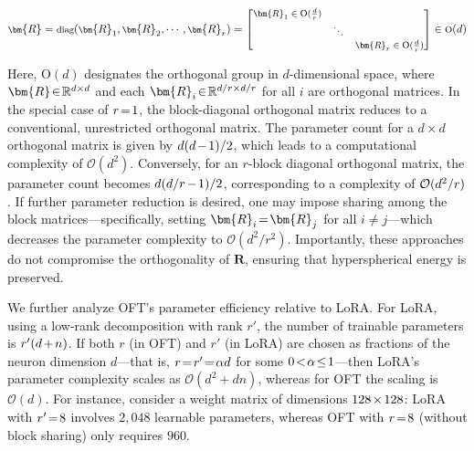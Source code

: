 \begin{equation}
    \footnotesize
    \bm{R}=\text{diag}(\bm{R}_1,\bm{R}_2,\cdots,\bm{R}_r)=\begin{bmatrix}
    \bm{R}_1\in \text{O}(\frac{d}{r}) &  &\\
    &\ddots & \\
    & & \bm{R}_r\in \text{O}(\frac{d}{r})
    \end{bmatrix}\in \text{O}(d)
\end{equation}

Here, $\text{O}(d)$ designates the orthogonal group in $d$-dimensional space, where $\thickmuskip=2mu \medmuskip=2mu \bm{R}\in\mathbb{R}^{d\times d}$ and each $\thickmuskip=2mu \medmuskip=2mu \bm{R}_i\in\mathbb{R}^{d/r\times d/r}$ for all $i$ are orthogonal matrices. In the special case of $\thickmuskip=2mu \medmuskip=2mu r=1$, the block-diagonal orthogonal matrix reduces to a conventional, unrestricted orthogonal matrix. The parameter count for a $d\times d$ orthogonal matrix is given by $\thickmuskip=2mu \medmuskip=2mu d(d-1)/2$, which leads to a computational complexity of $\mathcal{O}(d^2)$. Conversely, for an $r$-block diagonal orthogonal matrix, the parameter count becomes $\thickmuskip=2mu \medmuskip=2mu d(d/r-1)/2$, corresponding to a complexity of $\thickmuskip=2mu \medmuskip=2mu \mathcal{O}(d^2/r)$. If further parameter reduction is desired, one may impose sharing among the block matrices—specifically, setting $\thickmuskip=2mu \medmuskip=2mu\bm{R}_i=\bm{R}_j$ for all $i\neq j$—which decreases the parameter complexity to $\mathcal{O}(d^2/r^2)$. Importantly, these approaches do not compromise the orthogonality of $\bm{R}$, ensuring that hyperspherical energy is preserved.

We further analyze OFT's parameter efficiency relative to LoRA. For LoRA, using a low-rank decomposition with rank $r'$, the number of trainable parameters is $\thickmuskip=2mu \medmuskip=2mu r'(d+n)$. If both $r$ (in OFT) and $r'$ (in LoRA) are chosen as fractions of the neuron dimension $d$—that is, $\thickmuskip=2mu \medmuskip=2mu r=r'=\alpha d$ for some $\thickmuskip=2mu \medmuskip=2mu 0<\alpha\leq 1$—then LoRA's parameter complexity scales as $\mathcal{O}(d^2+dn)$, whereas for OFT the scaling is $\mathcal{O}(d)$. For instance, consider a weight matrix of dimensions $\thickmuskip=2mu \medmuskip=2mu 128\times 128$: LoRA with $\thickmuskip=2mu \medmuskip=2mu r'=8$ involves $2,048$ learnable parameters, whereas OFT with $\thickmuskip=2mu \medmuskip=2mu r=8$ (without block sharing) only requires $960$.

